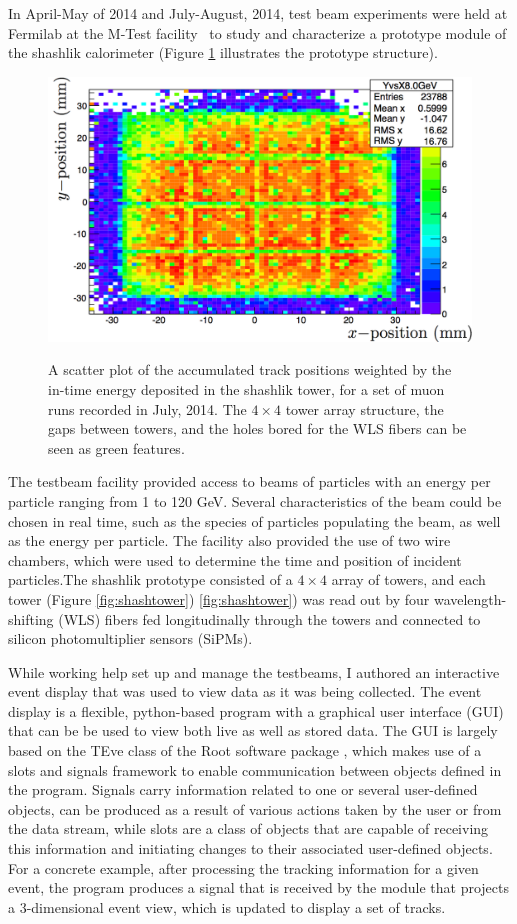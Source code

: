 In April-May of 2014 and July-August, 2014, test beam experiments were held at Fermilab at the M-Test facility~\cite{Fermi:T1041} to study and characterize a prototype module of the shashlik calorimeter (Figure \ref{fig:shashscatter} illustrates the prototype structure). 
\begin{figure}[h]\centering
\includegraphics[width=0.6\linewidth]{figures/CMS/Upgrade/TopoMap.png}\\
\caption{A scatter plot of the accumulated track positions weighted by the in-time energy deposited in the shashlik tower, for a set of muon runs recorded in July, 2014. The $4\times4$ tower array structure, the gaps between towers, and the holes bored for the WLS fibers can be seen as green features.}
\label{fig:shashscatter}
\end{figure}
The testbeam facility provided access to beams of particles with an energy per particle ranging from 1 to 120 GeV. Several characteristics of the beam could be chosen in real time, such as the species of particles populating the beam, as well as the energy per particle.  The facility also provided the use of two wire chambers, which were used to determine the time and position of incident particles.The shashlik prototype consisted of a $4\times4$ array of towers, and each tower (Figure \ref{fig:shashtower})
\ref{fig:shashtower})
was read out by four wavelength-shifting (WLS) fibers fed longitudinally through the towers and connected to silicon photomultiplier sensors (SiPMs). 

While working help set up and manage the testbeams, I authored an interactive event display that was used to view data as it was being collected. The event display is a flexible, python-based program with a graphical user interface (GUI) that can be be used to view both live as well as stored data. The GUI is largely based on the TEve class of the Root software package \cite{Brun:1997pa}, which makes use of a slots and signals framework to enable communication between objects defined in the program. Signals carry information related to one or several user-defined objects, can be produced as a result of various actions taken by the user or from the data stream, while slots are a class of objects that are capable of receiving this information and initiating changes to their associated user-defined objects. For a concrete example, after processing the tracking information for a given event, the program produces a signal that is received by the module that projects a 3-dimensional event view, which is updated to display a set of tracks.

